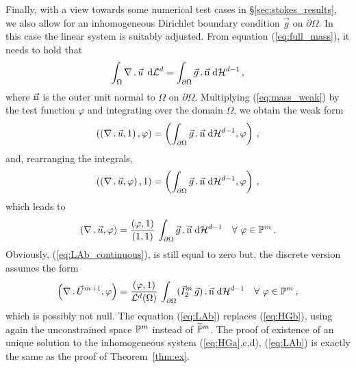 Finally, with a view towards some numerical test cases in
\S\ref{sec:stokes_results}, we also allow for an inhomogeneous Dirichlet
boundary condition $\vec g$ on $\partial\Omega$. In this case the linear system
is suitably adjusted. From equation (\ref{eq:full_mass}), it needs to hold that
\begin{equation}\label{eq:mass_weak}
 \int_{\Omega}\nabla\,.\,\vec u\, \;{\rm d}{\cal L}^{d} =
 \int_{\partial\Omega} \vec g \,.\, \vec{\rm n} \;{\rm d}{\cal H}^{d-1}\,,
\end{equation}
where $\vec{\rm n}$ is the outer unit normal to $\Omega$ on $\partial\Omega$.
Multiplying (\ref{eq:mass_weak}) by the test function $\varphi$ and integrating
over the domain $\Omega$, we obtain the weak form
\begin{equation}
 \left(\left(\nabla\,.\,\vec u, 1\right),\varphi\right) =
 \left(\int_{\partial\Omega} \vec g \,.\, \vec{\rm n} \;{\rm d}{\cal H}^{d-1},\varphi\right)\,,
\end{equation}
and, rearranging the integrals,
\begin{equation}
 \left(\left(\nabla\,.\,\vec u, \varphi\right),1\right) =
 \left(\int_{\partial\Omega} \vec g \,.\, \vec{\rm n} \;{\rm d}{\cal H}^{d-1},\varphi\right)\,,
\end{equation}
which leads to
\begin{equation}\label{eq:LAb_continuous}
 \left(\nabla\,.\,\vec u, \varphi\right) =
 \frac{\left(\varphi, 1\right)}{\left(1,1\right)}\, \int_{\partial\Omega}
\vec g \,.\, \vec{\rm n} \;{\rm d}{\cal H}^{d-1} \quad \forall\ \varphi \in
\mathbb{P}^m\,.
\end{equation}
Obviously, (\ref{eq:LAb_continuous}), is still equal to zero but, the discrete
version assumes the form
\begin{equation} \label{eq:LAb}
 \left(\nabla\,.\,\vec U^{m+1}, \varphi\right) =
 \frac{\left(\varphi, 1\right)}{\mathcal{L}^d(\Omega)}\, \int_{\partial\Omega}
(\vec I^m_2\,\vec g) \,.\, \vec{\rm n} \;{\rm d}{\cal H}^{d-1} \quad \forall\ \varphi \in
\mathbb{P}^m\,,
\end{equation}
which is possibly not null. The equation (\ref{eq:LAb}) replaces
(\ref{eq:HGb}), using again the unconstrained space $\mathbb{P}^m$ instead of
$\widetilde{\mathbb{P}}^m$. The proof of existence of an unique solution to the
inhomogeneous system (\ref{eq:HGa},c,d), (\ref{eq:LAb}) is exactly the same as
the proof of Theorem~\ref{thm:ex}.

